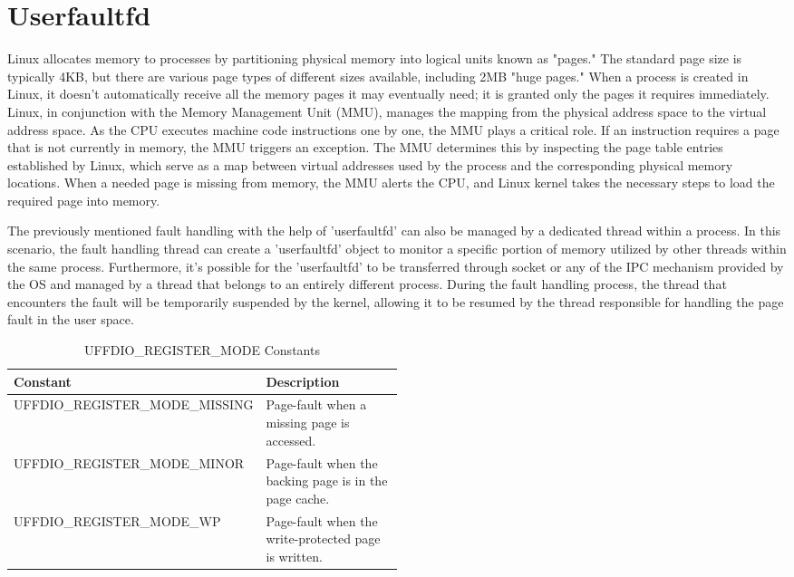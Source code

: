 \documentclass[article, doublespace,nopageskip]{VTthesis} %
\begin{document}
     \section{Userfaultfd} \label{ss:Userfaultfd}
     Linux allocates memory to processes by partitioning physical memory into logical units known as "pages." The standard page size is typically 4KB, but there are various page types of different sizes available, including 2MB "huge pages." When a process is created in Linux, it doesn't automatically receive all the memory pages it may eventually need; it is granted only the pages it requires immediately. Linux, in conjunction with the Memory Management Unit (MMU), manages the mapping from the physical address space to the virtual address space. As the CPU executes machine code instructions one by one, the MMU plays a critical role. If an instruction requires a page that is not currently in memory, the MMU triggers an exception. The MMU determines this by inspecting the page table entries established by Linux, which serve as a map between virtual addresses used by the process and the corresponding physical memory locations. When a needed page is missing from memory, the MMU alerts the CPU, and Linux kernel takes the necessary steps to load the required page into memory.

     The previously mentioned fault handling with the help of 'userfaultfd' \cite{userfaultfd} can also be managed by a dedicated thread within a process. In this scenario, the fault handling thread can create a 'userfaultfd' object to monitor a specific portion of memory utilized by other threads within the same process. Furthermore, it's possible for the 'userfaultfd' to be transferred through socket or any of the IPC mechanism provided by the OS and managed by a thread that belongs to an entirely different process. During the fault handling process, the thread that encounters the fault will be temporarily suspended by the kernel, allowing it to be resumed by the thread responsible for handling the page fault in the user space.
     
    \begin{table}[htbp]
    \centering
    \begin{tabular}{|l|p{0.5\linewidth}|}
        \hline
        \textbf{Constant} & \textbf{Description} \\
        \hline
        UFFDIO\_REGISTER\_MODE\_MISSING & Page-fault when a missing page is accessed. \\
        \hline
        UFFDIO\_REGISTER\_MODE\_MINOR & Page-fault when the backing page is in the page cache. \\
        \hline
        UFFDIO\_REGISTER\_MODE\_WP & Page-fault when the write-protected page is written. \\
        \hline
    \end{tabular}
    \caption{UFFDIO\_REGISTER\_MODE Constants}
    \label{tab:uffdio-modes}
    \end{table}
    
\end{document}
